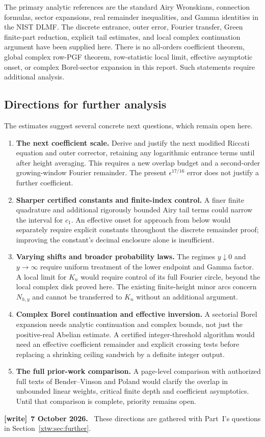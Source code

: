 \documentclass[11pt]{article}
\theoremstyle{remark}\newtheorem{remark}[theorem]{Remark}
\newenvironment{writenote}[1][]{\par\smallskip\begingroup\small
 \noindent\textbf{[write]}\if\relax\detokenize{#1}\relax\else~\textbf{#1.}\fi\ }%
 {\par\endgroup\smallskip}
\begin{document}
The primary analytic references are the standard Airy Wronskians,
connection formulas, sector expansions, real remainder inequalities, and
Gamma identities in the NIST DLMF. The discrete entrance, outer error,
Fourier transfer, Green finite-part reduction, explicit tail estimates,
and local complex continuation argument have been supplied here.
There is no all-orders coefficient theorem, global complex row-PGF theorem,
row-statistic local limit, effective asymptotic onset, or complex Borel-sector
expansion in this report. Such statements require additional analysis.

\subsection{Directions for further analysis}
The estimates suggest several concrete next questions, which remain open here.
\begin{enumerate}
\item \textbf{The next coefficient scale.} Derive and justify the next
modified Riccati equation and outer corrector, retaining any logarithmic
entrance terms until after height averaging. This requires a new overlap
budget and a second-order growing-window Fourier remainder. The present
$\epsilon^{17/16}$ error does not justify a further coefficient.
\item \textbf{Sharper certified constants and finite-index control.}
A finer finite quadrature and additional rigorously bounded Airy tail terms
could narrow the interval for $c_1$. An effective onset for approach from
below would separately require explicit constants throughout the discrete
remainder proof; improving the constant's decimal enclosure alone is
insufficient.
\item \textbf{Varying shifts and broader probability laws.}
The regimes $y\downarrow0$ and $y\to\infty$ require uniform treatment of the
lower endpoint and Gamma factor. A local limit for $K_n$ would require
control of its full Fourier circle, beyond the local complex disk proved
here. The existing finite-height minor arcs concern $N_{h,y}$ and cannot
be transferred to $K_n$ without an additional argument.
\item \textbf{Complex Borel continuation and effective inversion.}
A sectorial Borel expansion needs analytic continuation and complex bounds,
not just the positive-real Abelian estimate. A certified integer-threshold
algorithm would need an effective coefficient remainder and explicit
crossing tests before replacing a shrinking ceiling sandwich by a definite
integer output.
\item \textbf{The full prior-work comparison.}
A page-level comparison with authorized full texts of Bender--Vinson and
Poland would clarify the overlap in unbounded linear weights, critical
finite depth and coefficient asymptotics. Until that comparison is complete,
priority remains open.
\end{enumerate}
\begin{writenote}[7 October 2026]
These directions are gathered with Part~I's questions in Section~\ref{xtw:sec:further}.
\end{writenote}
\end{document}
